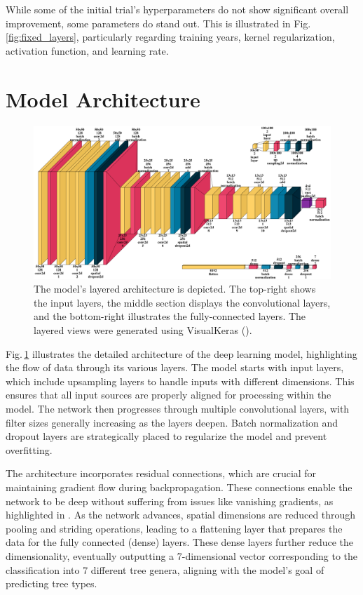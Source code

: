 While some of the initial trial's hyperparameters do not show significant overall improvement, some parameters do stand out. This is illustrated in Fig.\,\ref{fig:fixed_layers}, particularly regarding training years, kernel regularization, activation function, and learning rate.

\section{Model Architecture}

\begin{figure}[ht]
    \centering
    \includegraphics[width=0.9\linewidth]{figures/figures_tuner/model_layered_view.png}
    \caption{The model's layered architecture is depicted. The top-right shows the input layers, the middle section displays the convolutional layers, and the bottom-right illustrates the fully-connected layers. The layered views were generated using VisualKeras (\cite{visualkeras}).}
    \label{fig:model_layered_view}
\end{figure}

Fig.\,\ref{fig:model_layered_view} illustrates the detailed architecture of the deep learning model, highlighting the flow of data through its various layers. The model starts with input layers, which include upsampling layers to handle inputs with different dimensions. This ensures that all input sources are properly aligned for processing within the model. The network then progresses through multiple convolutional layers, with filter sizes generally increasing as the layers deepen. Batch normalization and dropout layers are strategically placed to regularize the model and prevent overfitting.

The architecture incorporates residual connections, which are crucial for maintaining gradient flow during backpropagation. These connections enable the network to be deep without suffering from issues like vanishing gradients, as highlighted in \cite{resnet}. As the network advances, spatial dimensions are reduced through pooling and striding operations, leading to a flattening layer that prepares the data for the fully connected (dense) layers. These dense layers further reduce the dimensionality, eventually outputting a 7-dimensional vector corresponding to the classification into 7 different tree genera, aligning with the model's goal of predicting tree types.

